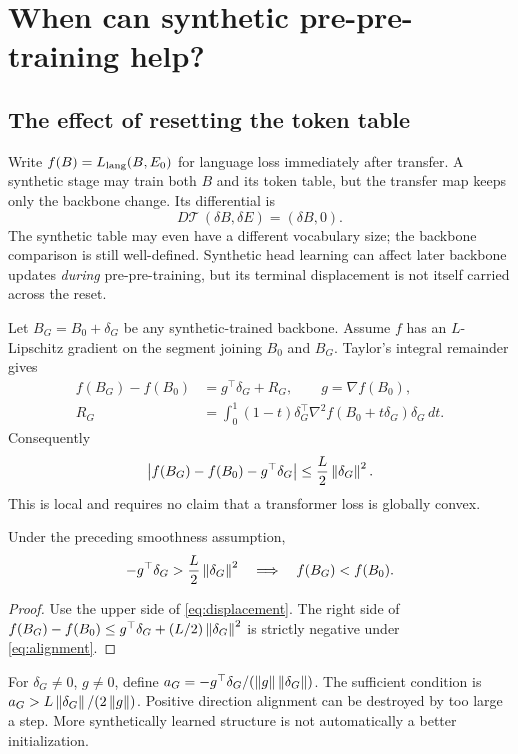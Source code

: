 \section{When can synthetic pre-pre-training help?}
\label{sec:transfer}

\subsection{The effect of resetting the token table}

Write $f(B)=L_{\rm lang}(B,E_0)$ for language loss immediately after
transfer. A synthetic stage may train both $B$ and its token table, but
the transfer map keeps only the backbone change. Its differential is
\begin{equation}
 D\mathcal T\,(\delta B,\delta E)=(\delta B,0).
 \label{eq:projection}
\end{equation}
The synthetic table may even have a different vocabulary size; the
backbone comparison is still well-defined. Synthetic head learning can
affect later backbone updates \emph{during} pre-pre-training, but its
terminal displacement is not itself carried across the reset.

Let $B_G=B_0+\delta_G$ be any synthetic-trained backbone. Assume $f$ has
an $L$-Lipschitz gradient on the segment joining $B_0$ and $B_G$.
Taylor's integral remainder gives
\begin{equation}
 \begin{aligned}
 f(B_G)-f(B_0)&=g^\top\delta_G+R_G,\qquad g=\nabla f(B_0),\\
 R_G&=\int_0^1(1-t)\delta_G^\top
    \nabla^2 f(B_0+t\delta_G)\delta_G\,dt.
 \end{aligned}
\end{equation}
Consequently
\begin{equation}
 \left|f(B_G)-f(B_0)-g^\top\delta_G\right|
 \leq\frac L2\left\lVert \delta_G\right\rVert^2.
 \label{eq:displacement}
\end{equation}
This is local and requires no claim that a transformer loss is globally
convex.

\begin{proposition}
\label{prop:alignment}
Under the preceding smoothness assumption,
\begin{equation}
 -g^\top\delta_G>\frac L2\left\lVert \delta_G\right\rVert^2
 \quad\Longrightarrow\quad f(B_G)<f(B_0).
 \label{eq:alignment}
\end{equation}
\end{proposition}
\begin{proof}
Use the upper side of \eqref{eq:displacement}. The right side of
$f(B_G)-f(B_0)\leq g^\top\delta_G+(L/2)\left\lVert \delta_G\right\rVert^2$
is strictly negative under \eqref{eq:alignment}.
\end{proof}
For $\delta_G\ne0$, $g\ne0$, define
$a_G=-g^\top\delta_G/(\left\lVert g\right\rVert\left\lVert \delta_G\right\rVert)$.
The sufficient condition is
$a_G>L\left\lVert \delta_G\right\rVert/(2\left\lVert g\right\rVert)$.
Positive direction alignment can be destroyed by too large a step.
More synthetically learned structure is not automatically a better
initialization.

